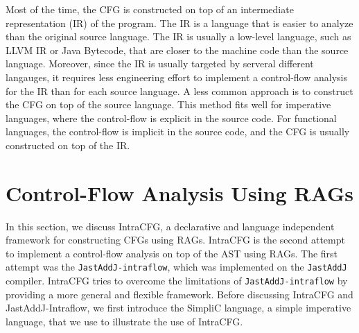 Most of the time, the CFG is constructed on top of an intermediate representation
(IR) of the program. The IR is a language that is easier to analyze than the original
source language. The IR is usually a low-level language, such as LLVM IR or Java Bytecode, that are
closer to the machine code than the source language. 
Moreover, since the IR is usually targeted by serveral different langauges, 
it requires less engineering effort to implement a control-flow analysis for the IR than for each
source language.
A less common approach is to construct the CFG on top of the source language.
This method fits well for imperative languages, where the control-flow is 
explicit in the source code. For functional languages, the
control-flow is implicit in the source code, and the CFG is usually constructed
on top of the IR.




\section{Control-Flow Analysis Using RAGs}
\label{sec:cfarag}
In this section, we discuss IntraCFG, a declarative and language independent framework for 
constructing CFGs using RAGs. IntraCFG is the second attempt to implement a control-flow analysis
on top of the AST using RAGs. The first attempt was the \texttt{JastAddJ-intraflow}, which was
implemented on the \texttt{JastAddJ} compiler. IntraCFG tries to overcome the limitations of
\texttt{JastAddJ-intraflow} by providing a more general and flexible framework.
Before discussing IntraCFG and JastAddJ-Intraflow, we first introduce the 
SimpliC language, a simple imperative language, that we use to illustrate the use of IntraCFG.

